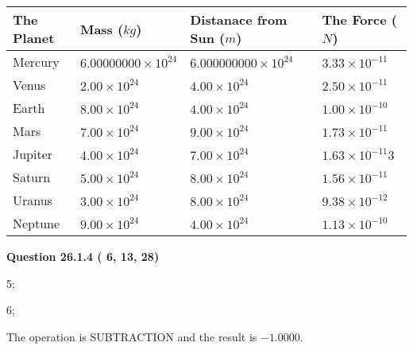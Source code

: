 \documentclass[12pt]{article}
\begin{document}
 
\begin{tabular}{|l|l|l|l|}
\hline
The Planet & Mass ($kg$) & Distanace from Sun ($m$) & The Force ($N$)\\
\hline
Mercury  &
           $ %
6.00000000 \times 10^{24}  $   &
             $ %
6.000000000 \times 10^{24}$    & $ %
3.33 \times 10^{-11} $
\\  \hline
Venus    &
           $  %
2.00 \times 10^{24}  $     &
             $ %
4.00 \times 10^{24} $    & $ %
2.50 \times 10^{-11} $
\\  \hline
Earth    &
           $  %
8.00 \times 10^{24}$     &
             $ %
4.00 \times 10^{24} $    & $ %
1.00 \times 10^{-10} $
\\   \hline
Mars     &
           $  %
7.00 \times 10^{24} $     &
             $ %
9.00 \times 10^{24}$    & $ %
1.73 \times 10^{-11} $
\\   \hline
Jupiter  &
           $  %
4.00 \times 10^{24}  $    &
             $ %
7.00 \times 10^{24} $    & $ %
1.63 \times 10^{-11}3 $
\\  \hline
Saturn   &
           $  %
5.00 \times 10^{24}   $    &
             $ %
8.00 \times 10^{24}  $    & $ %
1.56 \times 10^{-11} $
\\  \hline
Uranus   &
           $  %
3.00 \times 10^{24} $    &
             $ %
8.00 \times 10^{24}$    & $ %
9.38 \times 10^{-12} $
\\  \hline
Neptune  &
           $  %
9.00 \times 10^{24}  $    &
             $ %
4.00 \times 10^{24} $    & $ %
1.13 \times 10^{-10} $
\\  \hline
 
\end{tabular}
 
 
 
 
  
\vspace{0.2in}
  
{\textbf{\Large{Question
26.1.4 
 (          6,         13,         28)
}}}
  
  
 
 
\noindent{}

5;
 
6;
 
The operation is  %
SUBTRACTION and the result is
$ %
-1.0000$.
 
 
 
  
\vspace{0.2in}
  
\end{document}
